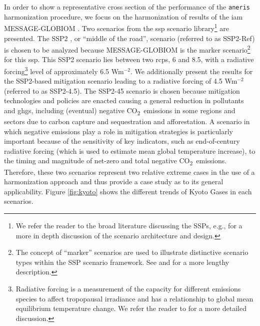 \documentclass[review]{elsarticle}
\newcommand{\code}[1]{\lstinline[basicstyle=\ttfamily\color{black}]|#1|}
\newcommand{\cotwo}{CO\textsubscript{2}~}
\begin{document}
In order to show a representative cross section of the performance of the
\code{aneris} harmonization procedure, we focus on the harmonization of results
of the \gls{iam} MESSAGE-GLOBIOM \cite{fricko_marker_2017}. Two scenarios from
the \gls{ssp} scenario library\footnote{We refer the reader to the broad
  literature discussing the SSPs, e.g.,
  \cite{vuuren_new_2013,oneill_scenario_2016, oneill_new_2013} for a more in
  depth discussion of the scenario architecture and design.} are presented. The
SSP2 \cite{Riahi2017153,Rao2017346}, or ``middle of the road'', scenario
(referred to as SSP2-Ref) is chosen to be analyzed because MESSAGE-GLOBIOM is
the marker scenario\footnote{The concept of ``marker'' scenarios are used to
  illustrate distinctive scenario types within the SSP scenario framework. See
  \cite{vuuren_new_2013} and \cite{Riahi2017153} for a more lengthy
  description.} for this \gls{ssp}. This SSP2 scenario lies between two
\glspl{rcp}, 6 and 8.5, with a radiative forcing\footnote{Radiative forcing is a
  measurement of the capacity for different emissions species to affect
  tropopausal irradiance and has a relationship to global mean equilibrium
  temperature change. We refer the reader to \cite{IPCCWG1PhysicalStocker2013}
  for a more detailed discussion.} level of approximately 6.5 Wm$^{-2}$. We
additionally present the results for the SSP2-based mitigation scenario leading
to a radiative forcing of 4.5 Wm$^{-2}$ (referred to as SSP2-4.5). The SSP2-45
scenario is chosen because mitigation technologies and policies are enacted
causing a general reduction in pollutants and \glspl{ghg}, including (eventual)
negative \cotwo emissions in some regions and sectors due to carbon capture and
sequestration and afforestation. A scenario in which negative emissions play a
role in mitigation strategies is particularly important because of the
sensitivity of key indicators, such as end-of-century radiative forcing (which
is used to estimate mean global temperature increase), to the timing and
magnitude of net-zero and total negative \cotwo emissions. Therefore, these two
scenarios represent two relative extreme cases in the use of a harmonization
approach and thus provide a case study as to its general applicability. Figure
\ref{fig:kyoto} shows the different trends of Kyoto Gases in each scenarios.
\end{document}

